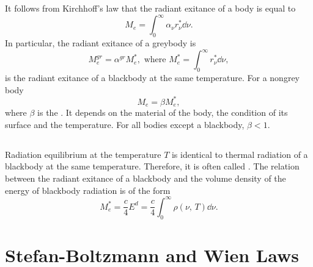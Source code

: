 \subsection{}\label{36.1.7} It follows from Kirchhoff's law that the radiant exitance  of a body is equal to
\begin{equation*}%
M_{e} = \int_{0}^{\infty} \alpha_{\nu} r_{\nu}^{*} \dd \nu.
\end{equation*}
In particular, the radiant exitance of a greybody is
\begin{equation*}%
M_{e}^{gr} = \alpha^{gr} M_{e}^{*}, \text{ where } M_{e}^{*} = \int_{0}^{\infty}  r_{\nu}^{*} \dd \nu,
\end{equation*}
is the radiant exitance of a blackbody at the same temperature. For a nongrey body
\begin{equation*}%
M_{e} = \beta M_{e}^{*},
\end{equation*}
where $\beta$ is the . It depends on the material of the body, the condition of its surface and the temperature. For all bodies except a blackbody, $\beta < 1$.

\subsection{}\label{36.1.8} Radiation equilibrium at the temperature $T$ is identical to thermal radiation of a blackbody at the same temperature. Therefore, it is often called . The relation between the radiant exitance of a blackbody and the volume density
of the energy of blackbody radiation is of the form
\begin{equation*}%
M_{e}^{*} = \frac{c}{4} E^{d} = \frac{c}{4} \int_{0}^{\infty}  \rho (\nu, \, T)  \dd \nu.
\end{equation*}

\section{Stefan-Boltzmann and Wien Laws}
\label{sec-36.2} 




